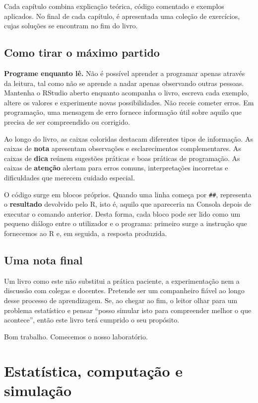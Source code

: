 \documentclass[
  portuguese,
  11pt,
  openany]{book}
\begin{document}
Cada capítulo combina explicação teórica, código comentado e exemplos aplicados. No final de cada capítulo, é apresentada uma coleção de exercícios, cujas soluções se encontram no fim do livro.

\section{Como tirar o máximo partido}\label{como-tirar-o-muxe1ximo-partido}

\textbf{Programe enquanto lê.} Não é possível aprender a programar apenas através da leitura, tal como não se aprende a nadar apenas observando outras pessoas. Mantenha o RStudio aberto enquanto acompanha o livro, escreva cada exemplo, altere os valores e experimente novas possibilidades. Não receie cometer erros. Em programação, uma mensagem de erro fornece informação útil sobre aquilo que precisa de ser compreendido ou corrigido.

Ao longo do livro, as caixas coloridas destacam diferentes tipos de informação. As caixas de \textbf{nota} apresentam observações e esclarecimentos complementares. As caixas de \textbf{dica} reúnem sugestões práticas e boas práticas de programação. As caixas de \textbf{atenção} alertam para erros comuns, interpretações incorretas e dificuldades que merecem cuidado especial.

O código surge em blocos próprios. Quando uma linha começa por \texttt{\#\#}, representa o \textbf{resultado} devolvido pelo R, isto é, aquilo que apareceria na Consola depois de executar o comando anterior. Desta forma, cada bloco pode ser lido como um pequeno diálogo entre o utilizador e o programa: primeiro surge a instrução que fornecemos ao R e, em seguida, a resposta produzida.

\section{Uma nota final}\label{uma-nota-final}

Um livro como este não substitui a prática paciente, a experimentação nem a discussão com colegas e docentes. Pretende ser um companheiro fiável ao longo desse processo de aprendizagem. Se, ao chegar ao fim, o leitor olhar para um problema estatístico e pensar ``posso simular isto para compreender melhor o que acontece'', então este livro terá cumprido o seu propósito.

Bom trabalho. Comecemos o nosso laboratório.

\chapter{Estatística, computação e simulação}\label{intro}
\end{document}
